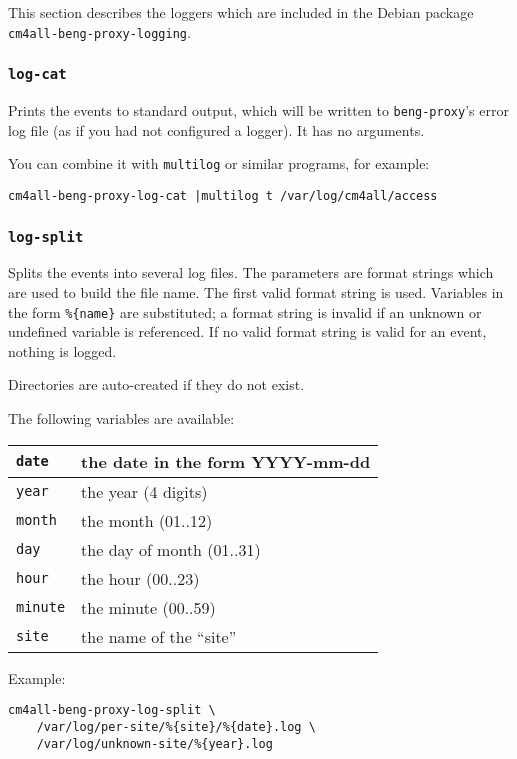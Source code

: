 \documentclass[a4paper,12pt]{article}
\begin{document}
This section describes the loggers which are included in the Debian
package \texttt{cm4all-beng-proxy-logging}.

\subsubsection{\texttt{log-cat}}

Prints the events to standard output, which will be written to
\texttt{beng-proxy}'s error log file (as if you had not configured a
logger).  It has no arguments.

You can combine it with \texttt{multilog} or similar programs, for
example:

\begin{verbatim}
cm4all-beng-proxy-log-cat |multilog t /var/log/cm4all/access
\end{verbatim}

\subsubsection{\texttt{log-split}}

Splits the events into several log files.  The parameters are format
strings which are used to build the file name.  The first valid format
string is used.  Variables in the form \texttt{\%\{name\}} are
substituted; a format string is invalid if an unknown or undefined
variable is referenced.  If no valid format string is valid for an
event, nothing is logged.

Directories are auto-created if they do not exist.

The following variables are available:

\begin{tabular}{|l|p{8cm}|}
\hline
\texttt{date} & the date in the form YYYY-mm-dd \\
\hline
\texttt{year} & the year (4 digits) \\
\hline
\texttt{month} & the month (01..12) \\
\hline
\texttt{day} & the day of month (01..31) \\
\hline
\texttt{hour} & the hour (00..23) \\
\hline
\texttt{minute} & the minute (00..59) \\
\hline
\texttt{site} & the name of the ``site'' \\
\hline
\end{tabular}

Example:

\begin{verbatim}
cm4all-beng-proxy-log-split \
    /var/log/per-site/%{site}/%{date}.log \
    /var/log/unknown-site/%{year}.log
\end{verbatim}
\end{document}
